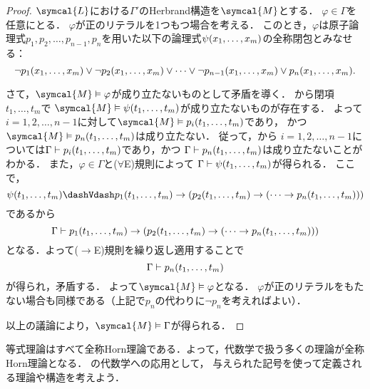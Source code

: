 \begin{proof}
	\(\symcal{L}\)における\(\Gamma'\)のHerbrand構造を\(\symcal{M}\)とする．
	\(\varphi \in \Gamma\)を任意にとる．
	\(\varphi\)が正のリテラルを1つもつ場合を考える．
	このとき，\(\varphi\)は原子論理式\(p_1, p_2, \dots, p_{n-1}, p_n\)を用いた以下の論理式\(\apply{\psi}{x_1, \dots, x_m}\)の全称閉包とみなせる：
	\[
		\lnot \apply{p_1}{x_1, \dots, x_m} \lor \lnot \apply{p_2}{x_1, \dots, x_m} \lor \dotsb \lor \lnot \apply{p_{n-1}}{x_1, \dots, x_m}
		\lor \apply{p_{n}}{x_1, \dots, x_m}.
	\]

	さて，\(\symcal{M} \satisfy \varphi\)が成り立たないものとして矛盾を導く．
	から閉項\(t_1, \dots, t_m\)で
	\(\symcal{M} \satisfy \apply{\psi}{t_1, \dots, t_m}\)が成り立たないものが存在する．
	よって\(i = 1, 2, \dots, n-1\)に対して\(\symcal{M} \satisfy \apply{p_i}{t_1, \dots, t_m}\)であり，
	かつ\(\symcal{M} \satisfy \apply{p_n}{t_1, \dots, t_m}\)は成り立たない．
	従って，から
	\(i = 1,2,\dots, n-1\)については\(\Gamma \provable \apply{p_i}{t_1, \dots, t_m}\)であり，かつ
	\(\Gamma \provable \apply{p_n}{t_1, \dots, t_m}\)は成り立たないことがわかる．
	また，\(\varphi \in \Gamma\)と(\(\forall\)E)規則によって
	\(\Gamma \provable \apply{\psi}{t_1, \dots, t_m}\)が得られる．
	ここで，
	\[
		\apply{\psi}{t_1, \dots, t_m} \interderivable \apply{p_1}{t_1, \dots, t_m} \to \paren{\apply{p_2}{t_1, \dots, t_m} \to \paren{\dotsb \to \apply{p_n}{t_1, \dots, t_m}}}
	\]
	であるから
	\[
		\Gamma \provable \apply{p_1}{t_1, \dots, t_m} \to \paren{\apply{p_2}{t_1, \dots, t_m} \to \paren{\dotsb \to \apply{p_n}{t_1, \dots, t_m}}}
	\]
	となる．よって(\(\to\)E)規則を繰り返し適用することで
	\[
		\Gamma \provable \apply{p_n}{t_1, \dots, t_m}
	\]
	が得られ，矛盾する．
	よって\(\symcal{M} \satisfy \varphi\)となる．
	\(\varphi\)が正のリテラルをもたない場合も同様である（上記で\(p_n\)の代わりに\(\lnot p_n\)を考えればよい）．

	以上の議論により，\(\symcal{M} \satisfy \Gamma\)が得られる．
\end{proof}


等式理論はすべて全称Horn理論である．よって，代数学で扱う多くの理論が全称Horn理論となる．
の代数学への応用として，
与えられた記号を使って定義される理論や構造を考えよう．

